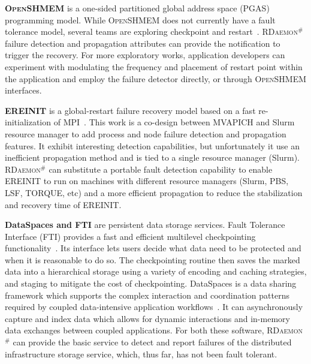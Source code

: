 \documentclass[5p,times,twocolumn]{elsarticle}
\newcommand{\mpi}[0]{\textsc{MPI}\xspace}
\newcommand{\oshmem}[0]{\textsc{OpenSHMEM}\xspace}
\newcommand{\ourwork}[0]{\textsc{RDaemon}\ensuremath{^\#}\xspace}
\begin{document}
\textbf{\oshmem} is a one-sided partitioned global address space (PGAS) programming model. While \oshmem does
not  currently have a fault tolerance model, several teams are exploring checkpoint and restart~\cite{shmem-ft15}.
\ourwork failure detection and propagation attributes can provide the
notification to trigger the recovery. For more exploratory works,
application developers can experiment with modulating the frequency and
 placement of restart point within the application and employ the
 failure detector directly, or through \oshmem interfaces.

\textbf{EREINIT} is a global-restart failure recovery model based
on a fast re-initialization of \mpi~\cite{reinit18}. This work is a co-design between MVAPICH and Slurm resource manager to add process and node failure detection and propagation features.
It exhibit interesting detection capabilities, but unfortunately it use an inefficient propagation method and is tied to a single resource manager (Slurm). \ourwork can substitute a portable fault detection capability to enable
EREINIT to run on machines with different resource managers (Slurm, PBS, LSF, TORQUE, etc) and a more efficient propagation
to reduce the stabilization and recovery time of EREINIT.

\textbf{DataSpaces and FTI} are persistent data storage services.
Fault Tolerance Interface (FTI) provides a fast and efficient multilevel
checkpointing functionality~\cite{Bautista-Gomez:2011:FHP:2063384.2063427}. Its interface lets users decide what data need to be protected and when it is reasonable to do so. The
checkpointing routine then saves the marked data into a hierarchical storage using a variety of
encoding and caching strategies, and staging to mitigate the cost of checkpointing.
DataSpaces is a data sharing framework which supports the complex
interaction and coordination patterns required by coupled data-intensive application workflows~\cite{Sun:2016:IDP:3018814.3018816}.
It can asynchronously capture and index data  which allows for dynamic interactions and in-memory
data exchanges between coupled applications. For both these software, \ourwork can provide the basic service to
detect and report  failures of the distributed infrastructure storage service, which, thus far, has not been
fault tolerant.
\end{document}
